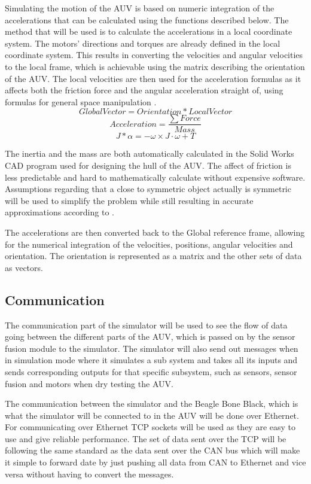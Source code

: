 Simulating the motion of the AUV is based on numeric integration of the accelerations that can be calculated using the functions described below. The method that will be used is to calculate the accelerations in a local coordinate system. The motors' directions and torques are already defined in the local coordinate system. This results in converting the velocities and angular velocities to the local frame, which is achievable using the matrix describing the orientation of the AUV. The local velocities are then used for the acceleration formulas as it affects both the friction force and the angular acceleration straight of, using formulas for general space manipulation \cite{book:corke2013}.
\begin{equation}
Global Vector = Orientation*Local Vector
\end{equation}
\begin{equation}
Acceleration = \frac{\sum Force}{Mass}
\end{equation}
\begin{equation}
J*\alpha = - \omega \times J \cdot\omega + T 
\end{equation}


The inertia and the mass are both automatically calculated in the Solid Works CAD program used for designing the hull of the AUV. The affect of friction is less predictable and hard to mathematically calculate without expensive software. Assumptions regarding that a close to symmetric object actually is symmetric will be used to simplify the problem while still resulting in accurate approximations according to \cite{4772083}.

The accelerations are then converted back to the Global reference frame, allowing for the numerical integration of the velocities, positions, angular velocities and orientation. The orientation is represented as a matrix and the other sets of data as vectors.
\subsection{Communication}

The communication part of the simulator will be used to see the flow of data going between the different parts of the AUV, which is passed on by the sensor fusion module to the simulator. The simulator will also send out messages when in simulation mode where it simulates a sub system and takes all its inputs and sends corresponding outputs for that specific subsystem, such as sensors, sensor fusion and motors when dry testing the AUV.

The communication between the simulator and the Beagle Bone Black, which is what the simulator will be connected to in the AUV will be done over Ethernet. For communicating over Ethernet TCP sockets will be used as they are easy to use and give reliable performance. The set of data sent over the TCP will be following the same standard as the data sent over the CAN bus which will make it simple to forward date by just pushing all data from CAN to Ethernet and vice versa without having to convert the messages.

